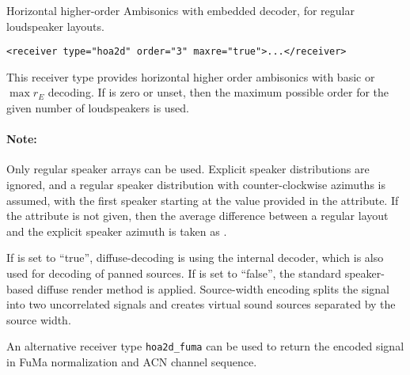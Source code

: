Horizontal higher-order Ambisonics with embedded decoder, for regular
loudspeaker layouts.

\begin{lstlisting}[numbers=none]
<receiver type="hoa2d" order="3" maxre="true">...</receiver>
\end{lstlisting}

This receiver type provides horizontal higher order ambisonics with
basic or $\max r_E$ decoding.
%
If  is zero or unset, then the maximum possible order for
the given number of loudspeakers is used.





\paragraph{Note:}
Only regular speaker arrays can be used. Explicit speaker
distributions are ignored, and a regular speaker distribution with
counter-clockwise azimuths is assumed, with the first speaker starting
at the value provided in the  attribute.
%
If the  attribute is not given, then the average
difference between a regular layout and the explicit speaker azimuth
is taken as .

If  is set to ``true'', diffuse-decoding is using the
internal decoder, which is also used for decoding of panned sources.
%
If  is set to ``false'', the standard speaker-based
diffuse render method is applied.
%
Source-width encoding splits the signal into two uncorrelated signals
and creates virtual sound sources separated by the source width.

An alternative receiver type \verb!hoa2d_fuma! can be used to return
the encoded signal in FuMa normalization and ACN channel sequence.
